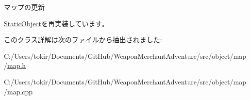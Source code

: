 マップの更新 



\mbox{\hyperlink{class_static_object_a7fa678c3c4032bb6e9417f93a8bb895c}{Static\+Object}}を再実装しています。



このクラス詳解は次のファイルから抽出されました\+:\begin{DoxyCompactItemize}
\item 
C\+:/\+Users/tokir/\+Documents/\+Git\+Hub/\+Weapon\+Merchant\+Adventure/src/object/map/\mbox{\hyperlink{map_8h}{map.\+h}}\item 
C\+:/\+Users/tokir/\+Documents/\+Git\+Hub/\+Weapon\+Merchant\+Adventure/src/object/map/\mbox{\hyperlink{map_8cpp}{map.\+cpp}}\end{DoxyCompactItemize}
